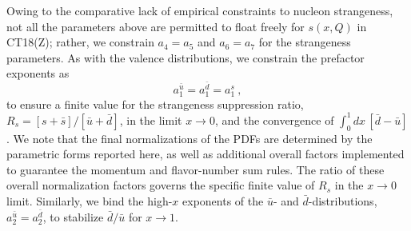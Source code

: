 %
%
%
Owing to the comparative lack of empirical constraints to nucleon strangeness, not all the parameters
above are permitted to float freely for $s(x,Q)$ in CT18(Z); rather, we constrain
$a_4\! =\! a_5$ and $a_6\! =\! a_7$ for the strangeness parameters.
%
%
%
As with the valence distributions, we constrain the prefactor exponents as
%
\begin{equation}
	a^{\bar{u}}_1 = a^{\bar{d}}_1 = a^s_1\ ,
\end{equation}
%
to ensure a finite value for the strangeness suppression ratio, $R_s\! =\! [s+\bar{s}] \big/ [\bar{u}+\bar{d}]$,
in the limit $x\!\to\!0$, and the convergence of $\int^1_0 dx\, [\bar{d}-\bar{u}]$. We note that the final normalizations of the PDFs are determined by the parametric forms reported here, as well as additional overall factors implemented to guarantee the momentum and flavor-number sum rules.  The ratio of these overall normalization factors governs the specific finite value of $R_s$ in the $x\!\to\! 0$
limit. Similarly, we bind the high-$x$ exponents of the $\bar{u}$- and $\bar{d}$-distributions, $a^{\bar{u}}_2\! =\! a^{\bar{d}}_2$, to stabilize $\bar{d}/\bar{u}$
for $x\!\to\!1$.

